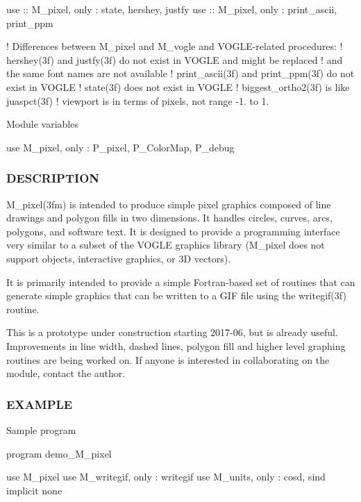 use \+:\+: M\+\_\+pixel, only \+: state, hershey, justfy use \+:\+: M\+\_\+pixel, only \+: print\+\_\+ascii, print\+\_\+ppm

! Differences between M\+\_\+pixel and M\+\_\+vogle and V\+O\+G\+L\+E-\/related procedures\+: ! hershey(3f) and justfy(3f) do not exist in V\+O\+G\+LE and might be replaced ! and the same font names are not available ! print\+\_\+ascii(3f) and print\+\_\+ppm(3f) do not exist in V\+O\+G\+LE ! state(3f) does not exist in V\+O\+G\+LE ! biggest\+\_\+ortho2(3f) is like juaspct(3f) ! viewport is in terms of pixels, not range -\/1. to 1.

Module variables

use M\+\_\+pixel, only \+: P\+\_\+pixel, P\+\_\+\+Color\+Map, P\+\_\+debug

\subsubsection*{D\+E\+S\+C\+R\+I\+P\+T\+I\+ON}

\begin{DoxyVerb}M_pixel(3fm) is intended to produce simple pixel graphics composed of
line drawings and polygon fills in two dimensions. It handles circles,
curves, arcs, polygons, and software text. It is designed to provide a
programming interface very similar to a subset of the VOGLE graphics
library (M_pixel does not support objects, interactive graphics,
or 3D vectors).

It is primarily intended to provide a simple Fortran-based set of
routines that can generate simple graphics that can be written to a
GIF file using the writegif(3f) routine.

This is a prototype under construction starting 2017-06, but is already
useful. Improvements in line width, dashed lines, polygon fill and
higher level graphing routines are being worked on. If anyone is
interested in collaborating on the module, contact the author.
\end{DoxyVerb}


\subsubsection*{E\+X\+A\+M\+P\+LE}

Sample program

program demo\+\_\+\+M\+\_\+pixel

use M\+\_\+pixel use M\+\_\+writegif, only \+: writegif use M\+\_\+units, only \+: cosd, sind implicit none

